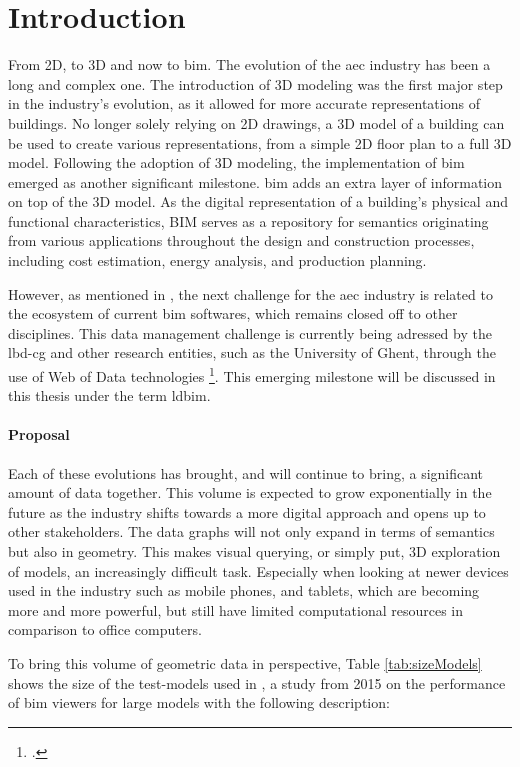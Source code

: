 \chapter{Introduction}
From 2D, to 3D and now to \acs{bim}. The evolution of the \ac{aec} industry has been a long and complex one. The introduction of 3D modeling was the first major step in the industry's evolution, as it allowed for more accurate representations of buildings. No longer solely relying on 2D drawings, a 3D model of a building can be used to create various representations, from a simple 2D floor plan to a full 3D model. Following the adoption of 3D modeling, the implementation of \ac{bim} emerged as another significant milestone. \ac{bim} adds an extra layer of information on top of the 3D model. As the digital representation of a building's physical and functional characteristics, BIM serves as a repository for semantics originating from various applications throughout the design and construction processes, including cost estimation, energy analysis, and production planning.

\label{sec:intro}
However, as mentioned in \cite{Werbrouck2018}, the next challenge for the \ac{aec} industry is related to the ecosystem of current \ac{bim} softwares, which remains closed off to other disciplines. This data management challenge is currently being adressed by the \ac{lbd-cg} and other research entities, such as the University of Ghent, through the use of Web of Data technologies \footcite{ldbimGroup}. This emerging milestone will be discussed in this thesis under the term \ac{ldbim}.

\subsubsection*{Proposal}
Each of these evolutions has brought, and will continue to bring, a significant amount of data together. This volume is expected to grow exponentially in the future as the industry shifts towards a more digital approach and opens up to other stakeholders. The data graphs will not only expand in terms of semantics but also in geometry. This makes visual querying, or simply put, 3D exploration of models, an increasingly difficult task. Especially when looking at newer devices used in the industry such as mobile phones, and tablets, which are becoming more and more powerful, but still have limited computational resources in comparison to office computers.

To bring this volume of geometric data in perspective, Table \ref{tab:sizeModels} shows the size of the test-models used in \cite{Johansson2015} , a study from 2015 on the performance of \ac{bim} viewers for large models with the following description:

